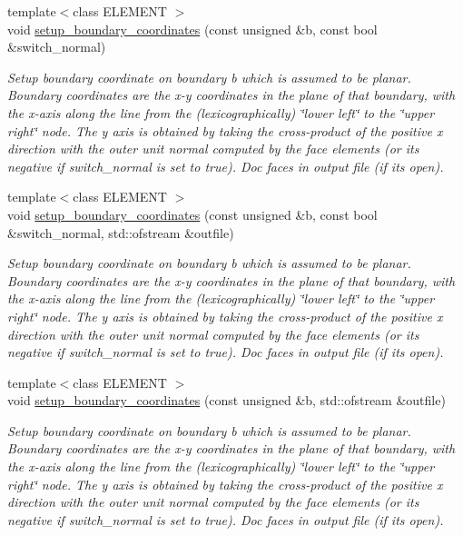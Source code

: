 \begin{DoxyCompactItemize}
{\footnotesize template$<$class E\+L\+E\+M\+E\+NT $>$ }\\void \hyperlink{classoomph_1_1TetMeshBase_a310a2204aabf22555f22ca9117e9ebc7}{setup\+\_\+boundary\+\_\+coordinates} (const unsigned \&b, const bool \&switch\+\_\+normal)
\begin{DoxyCompactList}\small\item\em Setup boundary coordinate on boundary b which is assumed to be planar. Boundary coordinates are the x-\/y coordinates in the plane of that boundary, with the x-\/axis along the line from the (lexicographically) \char`\"{}lower left\char`\"{} to the \char`\"{}upper right\char`\"{} node. The y axis is obtained by taking the cross-\/product of the positive x direction with the outer unit normal computed by the face elements (or its negative if switch\+\_\+normal is set to true). Doc faces in output file (if it\textquotesingle{}s open). \end{DoxyCompactList}\item 
{\footnotesize template$<$class E\+L\+E\+M\+E\+NT $>$ }\\void \hyperlink{classoomph_1_1TetMeshBase_a735a6e9b8ba1937d442965ca8546f8a5}{setup\+\_\+boundary\+\_\+coordinates} (const unsigned \&b, const bool \&switch\+\_\+normal, std\+::ofstream \&outfile)
\begin{DoxyCompactList}\small\item\em Setup boundary coordinate on boundary b which is assumed to be planar. Boundary coordinates are the x-\/y coordinates in the plane of that boundary, with the x-\/axis along the line from the (lexicographically) \char`\"{}lower left\char`\"{} to the \char`\"{}upper right\char`\"{} node. The y axis is obtained by taking the cross-\/product of the positive x direction with the outer unit normal computed by the face elements (or its negative if switch\+\_\+normal is set to true). Doc faces in output file (if it\textquotesingle{}s open). \end{DoxyCompactList}\item 
{\footnotesize template$<$class E\+L\+E\+M\+E\+NT $>$ }\\void \hyperlink{classoomph_1_1TetMeshBase_aeb870f849736e2c5d29e54a9b50946ef}{setup\+\_\+boundary\+\_\+coordinates} (const unsigned \&b, std\+::ofstream \&outfile)
\begin{DoxyCompactList}\small\item\em Setup boundary coordinate on boundary b which is assumed to be planar. Boundary coordinates are the x-\/y coordinates in the plane of that boundary, with the x-\/axis along the line from the (lexicographically) \char`\"{}lower left\char`\"{} to the \char`\"{}upper right\char`\"{} node. The y axis is obtained by taking the cross-\/product of the positive x direction with the outer unit normal computed by the face elements (or its negative if switch\+\_\+normal is set to true). Doc faces in output file (if it\textquotesingle{}s open). \end{DoxyCompactList}\item 

\end{DoxyCompactItemize}
